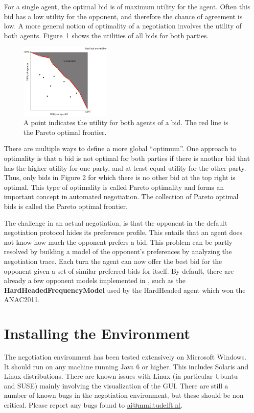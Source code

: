 \documentclass[]{article}
\begin{document}
For a single agent, the optimal bid is of maximum utility for the agent. Often this bid has a low utility for the opponent, and therefore the chance of agreement is low. A more general notion of optimality of a negotiation involves the utility of both agents. Figure~\ref{Fig:utility plot} shows the utilities of all bids for both parties.
 
\begin{figure}[htb]
	\centering
	\includegraphics[width=0.4\textwidth]{media/image5.pdf}
\caption{A point indicates the utility for both agents of a bid. The red line is the Pareto optimal frontier.}\label{Fig:utility plot}
\end{figure}

There are multiple ways to define a more global ``optimum''. One approach to optimality is that a bid is not optimal for both parties if there is another bid that has the higher utility for one party, and at least equal utility for the other party. Thus, only bids in Figure 2 for which there is no other bid at the top right is optimal. This type of optimality is called Pareto optimality and forms an important concept in automated negotiation. The collection of Pareto optimal bids is called the Pareto optimal frontier.

The challenge in an actual negotiation, is that the opponent in the default negotiation protocol hides its preference profile. This entails that an agent does not know how much the opponent prefers a bid. This problem can be partly resolved by building a model of the opponent's preferences by analyzing the negotiation trace. Each turn the agent can now offer the best bid for the opponent given a set of similar preferred bids for itself. By default, there are already a few opponent models implemented in \Genius, such as the \textbf{HardHeadedFrequencyModel} used by the HardHeaded agent which won the ANAC2011.
 
\section{Installing the Environment}
The negotiation environment has been tested extensively on Microsoft Windows. It should run on any machine running Java 6 or higher. This includes Solaris and Linux distributions. There are known issues with Linux (in particular Ubuntu and SUSE) mainly involving the visualization of the GUI. There are still a number of known bugs in the negotiation environment, but these should be non critical. Please report any bugs found to \url{ai@mmi.tudelft.nl}.
\end{document}
